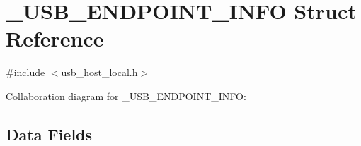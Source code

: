 \hypertarget{struct___u_s_b___e_n_d_p_o_i_n_t___i_n_f_o}{}\section{\+\_\+\+U\+S\+B\+\_\+\+E\+N\+D\+P\+O\+I\+N\+T\+\_\+\+I\+N\+F\+O Struct Reference}
\label{struct___u_s_b___e_n_d_p_o_i_n_t___i_n_f_o}


{\ttfamily \#include $<$usb\+\_\+host\+\_\+local.\+h$>$}



Collaboration diagram for \+\_\+\+U\+S\+B\+\_\+\+E\+N\+D\+P\+O\+I\+N\+T\+\_\+\+I\+N\+F\+O\+:
\subsection*{Data Fields}
